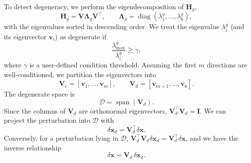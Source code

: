 To detect degeneracy, we perform the eigendecomposition of $\mathbf{H}_g$,
\begin{equation}
    \mathbf{H}_g = \mathbf{V}\bm{\Lambda}_g\mathbf{V}^{\top}, \qquad
    \bm{\Lambda}_g = \operatorname{diag}\left(\lambda_1^g, \ldots, \lambda_6^g\right),
\end{equation}
with the eigenvalues sorted in descending order. We treat the eigenvalue $\lambda_i^g$ (and its eigenvector $\mathbf{v}_i$) as degenerate if
\begin{equation}
    \frac{\lambda_{\max}^g}{\lambda_i^g} \geq \gamma,
\end{equation}
where $\gamma$ is a user-defined condition threshold. Assuming the first $m$ directions are well-conditioned, we partition the eigenvectors into
\begin{equation}
    \mathbf{V}_c = \left[\mathbf{v}_1, \ldots, \mathbf{v}_m\right], \qquad
    \mathbf{V}_d = \left[\mathbf{v}_{m+1}, \ldots, \mathbf{v}_6\right].
\end{equation}
The degenerate space is
\begin{equation}
    \mathcal{D} = \operatorname{span}\left(\mathbf{V}_d\right).
\end{equation}
Since the columns of $\mathbf{V}_d$ are orthonormal eigenvectors, $\mathbf{V}_d^{\top}\mathbf{V}_d = \mathbf{I}$. We can project the perturbation into $\mathcal{D}$ with
\begin{equation}
    \delta\mathbf{x}_d = \mathbf{V}_d^{\top}\delta\mathbf{x}.
\end{equation}
Conversely, for a perturbation lying in $\mathcal{D}$, $\mathbf{V}_d^{\top}\mathbf{V}_d\delta\mathbf{x}_d = \mathbf{V}_d^{\top}\delta\mathbf{x}$, and we have the inverse relationship
\begin{equation}
    \delta\mathbf{x} = \mathbf{V}_d\,\delta\mathbf{x}_d.
\end{equation}

